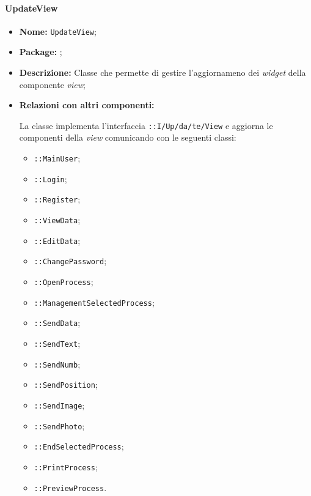 \paragraph{UpdateView}
\begin{flushleft}
\begin{itemize}
\item \textbf{Nome:} \texttt{UpdateView};
\item \textbf{Package:} \texttt{\viewAdmin{}};
\item \textbf{Descrizione:} Classe che permette di gestire l’aggiornameno dei \textit{widget} della componente \textit{view};
\item \textbf{Relazioni con altri componenti:}
\begin{sloppypar}
La classe implementa l'interfaccia \texttt{\iViewUser{}::I\fshyp{}Up\fshyp{}da\fshyp{}te\fshyp{}View} e aggiorna le componenti della \textit{view} comunicando con le seguenti classi:
\begin{itemize}
\item \texttt{\viewAdmin{}::MainUser};
\item \texttt{\viewAdmin{}::Login};
\item \texttt{\viewAdmin{}::Register};
\item \texttt{\viewAdmin{}::ViewData};
\item \texttt{\viewAdmin{}::EditData};
\item \texttt{\viewAdmin{}::ChangePassword};
\item \texttt{\viewAdmin{}::OpenProcess};
\item \texttt{\viewAdmin{}::ManagementSelectedProcess};
\item \texttt{\viewAdmin{}::SendData};
\item \texttt{\viewAdmin{}::SendText};
\item \texttt{\viewAdmin{}::SendNumb};
\item \texttt{\viewAdmin{}::SendPosition};
\item \texttt{\viewAdmin{}::SendImage};
\item \texttt{\viewAdmin{}::SendPhoto};
\item \texttt{\viewAdmin{}::EndSelectedProcess};
\item \texttt{\viewAdmin{}::PrintProcess};
\item \texttt{\viewAdmin{}::PreviewProcess}.
\end{itemize}
\end{sloppypar}
\end{itemize}
\end{flushleft}

